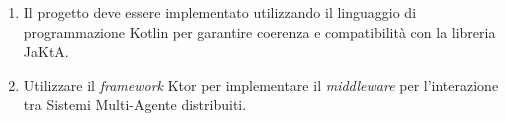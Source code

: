 \begin{enumerate}
      \item  Il progetto deve essere implementato utilizzando il linguaggio di programmazione Kotlin per garantire coerenza e compatibilità con la libreria JaKtA.
      \item Utilizzare il \textit{framework} Ktor per implementare il \textit{middleware} per l'interazione tra Sistemi Multi-Agente distribuiti.
\end{enumerate}


